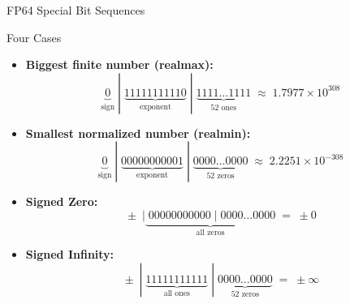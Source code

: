 \documentclass[10pt]{beamer}
\begin{document}
\begin{frame}[shrink]{FP64 Special Bit Sequences}
\begin{block}{Four Cases}
\begin{itemize}
  \item \textbf{Biggest finite number (realmax):}  
  \[
  \underbrace{0}_{\text{sign}}
  \;|\;
  \underbrace{11111111110}_{\text{exponent}}
  \;|\;
  \underbrace{1111\dots1111}_{52 \text{ ones}}
  \;\approx\; 1.7977\times 10^{308}
  \]

  \item \textbf{Smallest normalized number (realmin):}  
  \[
  \underbrace{0}_{\text{sign}}
  \;|\;
  \underbrace{00000000001}_{\text{exponent}}
  \;|\;
  \underbrace{0000\dots0000}_{52 \text{ zeros}}
  \;\approx\; 2.2251\times 10^{-308}
  \]

  \item \textbf{Signed Zero:}  
  \[
  \boxed{\pm}\;|\underbrace{\;00000000000\;|\;0000\dots0000}_{\text{all zeros}}
  \;=\;
  \pm0
  \]

  \item \textbf{Signed Infinity:}  
  \[
  \boxed{\pm}
  \;|\;
  \underbrace{11111111111}_{\text{all ones}}
  \;|\;
  \underbrace{0000\dots0000}_{52 \text{ zeros}} \;=\; \pm \infty
  \]

\end{itemize}
\end{block}

\end{frame}
\end{document}
